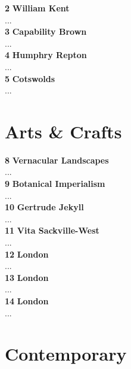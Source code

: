 \documentclass[11pt,article,oneside]{memoir}
\begin{document}
\noindent \textbf{2} 
\enspace
\textbf{William Kent}
\\
\noindent
...
\\


\noindent \textbf{3} 
\enspace
\textbf{Capability Brown}
\\
\noindent
...
\\

\noindent \textbf{4} 
\enspace
\textbf{Humphry Repton}
\\
\noindent
...
\\

\noindent \textbf{5} 
\enspace
\textbf{Cotswolds}
\\
\noindent
...
\\

\section{Arts \& Crafts}

\noindent \textbf{8} 
\enspace
\textbf{Vernacular Landscapes}
\\
\noindent
...
\\

\noindent \textbf{9} 
\enspace
\textbf{Botanical Imperialism}
\\
\noindent
...
\\

\noindent \textbf{10} 
\enspace
\textbf{Gertrude Jekyll}
\\
\noindent
...
\\

\noindent \textbf{11} 
\enspace
\textbf{Vita Sackville-West}
\\
\noindent
...
\\

\noindent \textbf{12} 
\enspace
\textbf{London}
\\
\noindent
...
\\

\noindent \textbf{13} 
\enspace
\textbf{London}
\\
\noindent
...
\\

\noindent \textbf{14} 
\enspace
\textbf{London}
\\
\noindent
...
\\

\section{Contemporary}
\end{document}
